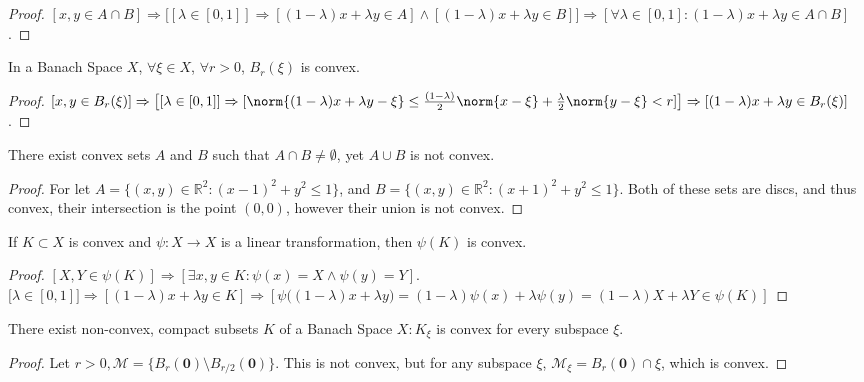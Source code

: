 \documentclass[crop=false,class=book,oneside]{standalone}
\begin{document}
            \begin{proof}
            $[x,y \in A\cap B] \Rightarrow \big[[\lambda \in [0,1]]\Rightarrow[ (1-\lambda)x+\lambda y \in A]\land [ (1-\lambda)x+\lambda y \in B]\big] \Rightarrow [\forall \lambda \in [0,1]:(1-\lambda)x+\lambda y \in A\cap B]$. 
            \end{proof}
            \begin{lemma}
            In a Banach Space $X$, $\forall \xi \in X$, $\forall r>0$, $B_{r}(\xi)$ is convex.
            \end{lemma}
            \begin{proof}
            $[x,y\in B_{r}(\xi)]\Rightarrow\big[[\lambda \in [0,1]]\Rightarrow [\norm{(1-\lambda)x+\lambda y-\xi}\leq \frac{(1-\lambda)}{2}\norm{x-\xi}+\frac{\lambda}{2} \norm{y-\xi}< r]\big]\Rightarrow [(1-\lambda)x+\lambda y \in B_{r}(\xi)]$.
            \end{proof}
            \begin{theorem}
            There exist convex sets $A$ and $B$ such that $A\cap B \ne \emptyset$, yet $A\cup B$ is not convex.
            \end{theorem}
            \begin{proof}
            For let $A = \{(x,y)\in \mathbb{R}^2: (x-1)^2+y^2\leq 1\}$, and $B = \{(x,y)\in \mathbb{R}^2:(x+1)^2+y^2\leq 1\}$. Both of these sets are discs, and thus convex, their intersection is the point $(0,0)$, however their union is not convex.
            \end{proof}
            \begin{theorem}
            If $K\subset X$ is convex and $\psi:X\rightarrow X$ is a linear transformation, then $\psi(K)$ is convex.
            \end{theorem}
            \begin{proof}
            $[X,Y\in \psi(K)]\Rightarrow [\exists x,y\in K:\psi(x)=X\land \psi(y)=Y]$. $\big[\lambda \in [0,1]\big]\Rightarrow [(1-\lambda)x+\lambda y\in K]\Rightarrow [\psi\big((1-\lambda)x+\lambda y\big)=(1-\lambda)\psi(x)+\lambda\psi(y) = (1-\lambda)X+\lambda Y \in \psi(K)]$
            \end{proof}
            \begin{theorem}
            There exist non-convex, compact subsets $K$ of a Banach Space $X: K_{\xi}$ is convex for every subspace $\xi$.
            \end{theorem}
            \begin{proof}
            Let $r>0, \mathcal{M} = \{B_{r}(\mathbf{0})\setminus B_{r/2}(\mathbf{0})\}$. This is not convex, but for any subspace $\xi$, $\mathcal{M}_{\xi} = B_{r}(\mathbf{0})\cap \xi$, which is convex.
            \end{proof}
\end{document}
